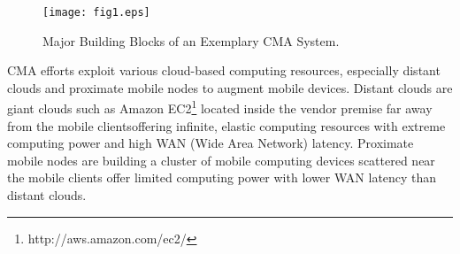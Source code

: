 \documentclass[publish]{IEEEtran}
\begin{document}
\begin{figure*}[t]
\centering
\texttt{[image: fig1.eps]}
\caption{Major Building Blocks of an Exemplary CMA System.} \label{CMA building blocks}
\end{figure*}

CMA efforts \cite{Huerta-Canepa, cuervo2010maui,Satyanarayanan2009, Verbelen2012,Hung2012,Kempa, Kosta2011, Guo2011, A.Manjunatha2010,Zhang2011, Chun2011, Chun2009,March2011,Luo2009, Badidi2011, Liu2009, Kumar2010,Chuna,Lu2011,Kemp2010a, Kemp2010, MOMCC, SAMI, Ma2012, Verbelen2012,Gu2012,Giurgiu2009} exploit various cloud-based computing resources, especially distant clouds and proximate mobile nodes to augment mobile devices. Distant clouds are giant clouds such as Amazon EC2\footnote{http://aws.amazon.com/ec2/} located inside the vendor premise \textemdash far away from the mobile clients\textemdash offering infinite, elastic computing resources with extreme computing power and high WAN (Wide Area Network) latency. Proximate mobile nodes are building a cluster of mobile computing devices scattered near the mobile clients offer limited computing power with lower WAN latency than distant clouds. 
\end{document}
